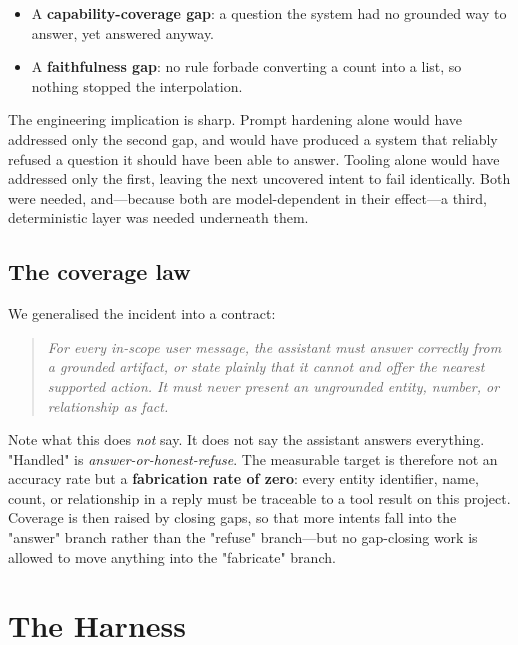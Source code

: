 \documentclass[conference]{IEEEtran}
\begin{document}
\begin{itemize}
  \item A \textbf{capability-coverage gap}: a question the system had no grounded
        way to answer, yet answered anyway.
  \item A \textbf{faithfulness gap}: no rule forbade converting a count into a
        list, so nothing stopped the interpolation.
\end{itemize}

The engineering implication is sharp. Prompt hardening alone would have addressed
only the second gap, and would have produced a system that reliably refused a
question it should have been able to answer. Tooling alone would have addressed
only the first, leaving the next uncovered intent to fail identically. Both were
needed, and---because both are model-dependent in their effect---a third,
deterministic layer was needed underneath them.

\subsection{The coverage law}

We generalised the incident into a contract:

\begin{quote}
\itshape
For every in-scope user message, the assistant must answer correctly from a
grounded artifact, or state plainly that it cannot and offer the nearest
supported action. It must never present an ungrounded entity, number, or
relationship as fact.
\end{quote}

Note what this does \emph{not} say. It does not say the assistant answers
everything. "Handled" is \emph{answer-or-honest-refuse}. The measurable target is
therefore not an accuracy rate but a \textbf{fabrication rate of zero}: every
entity identifier, name, count, or relationship in a reply must be traceable to a
tool result on this project. Coverage is then raised by closing gaps, so that
more intents fall into the "answer" branch rather than the "refuse" branch---but
no gap-closing work is allowed to move anything into the "fabricate" branch.

\section{The Harness}
\label{sec:harness}
\end{document}
